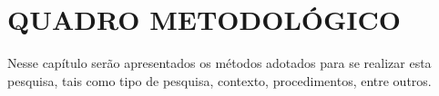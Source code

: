 \chapter{QUADRO METODOLÓGICO}

	\par Nesse capítulo serão apresentados os métodos adotados para se realizar esta
pesquisa, tais como tipo de pesquisa, contexto, procedimentos, entre outros.








